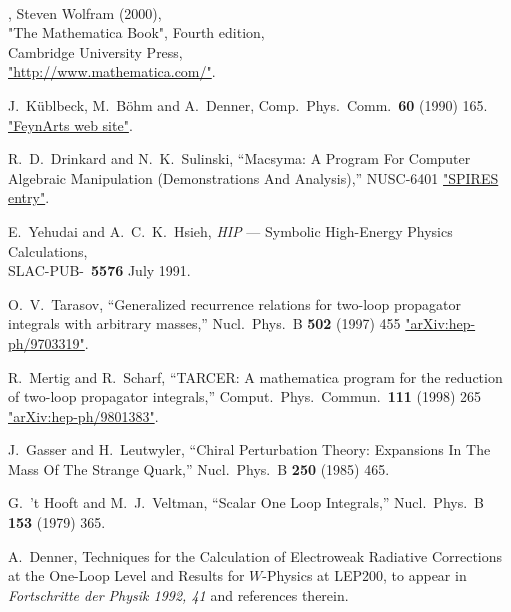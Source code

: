 
~\vspace{3cm}

\begin{thebibliography}{99}

,
Steven Wolfram (2000), \\
"The Mathematica Book", Fourth edition, \\
Cambridge University Press, \\
\href{http://www.mathematica.com/}{"http://www.mathematica.com/"}.

 J.~K\"ublbeck, M.~B\"ohm and A.~Denner, 
Comp.~Phys.~Comm.~{\bf 60} (1990) 165.\\
\href{http://www.feynarts.de/}{"FeynArts web site"}.

R.~D.~Drinkard and N.~K.~Sulinski,
``Macsyma: A Program For Computer Algebraic Manipulation (Demonstrations And Analysis),''
NUSC-6401
\href{http://www.slac.stanford.edu/spires/find/hep/www?r=nusc-6401}{"SPIRES entry"}.

E.~Yehudai and A.~C.~K.~Hsieh,
{\sl HIP\/} --- Symbolic  High-Energy Physics Calculations, \\
SLAC-PUB-~{\bf 5576} July 1991.

O.~V.~Tarasov,
``Generalized recurrence relations for two-loop propagator integrals with  arbitrary masses,''
Nucl.\ Phys.\ B {\bf 502} (1997) 455
\href{http://xxx.lanl.gov/abs/hep-ph/9703319}{"arXiv:hep-ph/9703319"}.

R.~Mertig and R.~Scharf,
``TARCER: A mathematica program for the reduction of two-loop propagator  integrals,''
Comput.\ Phys.\ Commun.\  {\bf 111} (1998) 265
\href{http://xxx.lanl.gov/abs/hep-ph/9801383}{"arXiv:hep-ph/9801383"}.

J.~Gasser and H.~Leutwyler,
``Chiral Perturbation Theory: Expansions In The Mass Of The Strange Quark,''
Nucl.\ Phys.\ B {\bf 250} (1985) 465.

G.~'t Hooft and M.~J.~Veltman,
``Scalar One Loop Integrals,''
Nucl.\ Phys.\ B {\bf 153} (1979) 365.

A.~Denner,  Techniques for the Calculation of Electroweak 
Radiative Corrections at the One-Loop Level and Results for 
$W$-Physics at LEP200, 
to appear in {\sl Fortschritte der Physik 1992, 41} 
and references therein.


\end{thebibliography}
